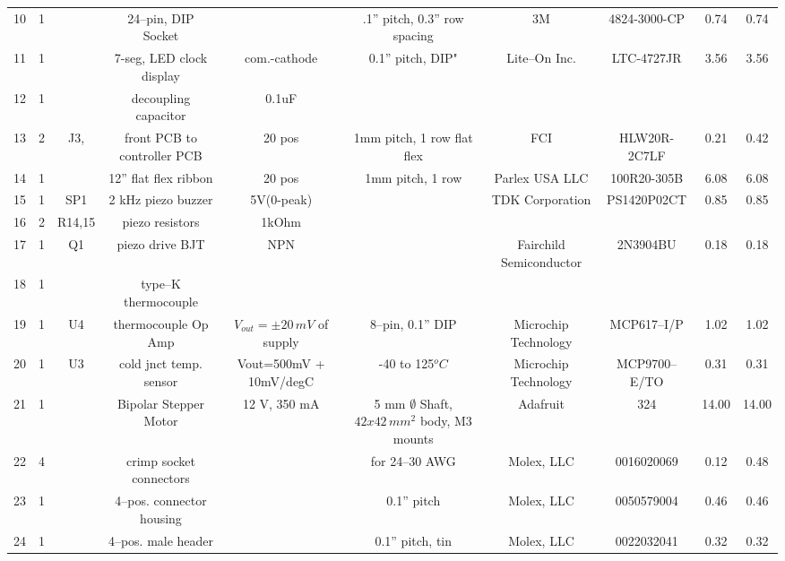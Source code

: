 \documentclass[10pt, twocolumn]{article}
\begin{document}
\begin{center}
\begin{adjustbox}{max width=\textwidth}
\begin{tabular}{c c c c c c c c c c}
10	&1	&	&24--pin, DIP Socket	&				&.1” pitch, 0.3” row spacing
	&3M		&4824-3000-CP			&0.74		&0.74	\\

11	&1	&	&7-seg, LED clock display	&com.-cathode	&0.1” pitch, DIP"
	&Lite--On Inc.		&LTC-4727JR		&3.56		&3.56	\\

12	&1	&	&decoupling capacitor	&0.1uF				&
	&		&				&		&	\\

13	&2	&J3,	&front PCB to controller PCB	&20 pos			&1mm pitch, 1 row flat flex
	&FCI			&HLW20R-2C7LF		&0.21		&0.42	\\

14	&1	&	&12” flat flex ribbon		&20 pos		&1mm pitch, 1 row
	&Parlex USA LLC		&100R20-305B		&6.08		&6.08	\\

15	&1	&SP1	&2 kHz piezo buzzer	&5V(0-peak)			&
	&TDK Corporation	&PS1420P02CT		&0.85		&0.85	\\

16	&2	&R14,15	&piezo resistors	&1kOhm				&
	&			&			&		&	\\

17	&1	&Q1	&piezo drive BJT		&NPN				&
	&Fairchild Semiconductor	&2N3904BU	&0.18		&0.18	\\

18	&1	&	&type--K thermocouple	&				&
	&			&			&		&	\\

19	&1	&U4	&thermocouple Op Amp	&$V_{out}=\pm 20\,mV$ of supply	&8--pin, 0.1” DIP
	&Microchip Technology	&MCP617--I/P		&1.02		&1.02	\\

20	&1	&U3	&cold jnct temp. sensor	&Vout=500mV + 10mV/degC 	&-40 to 125$^{o}C$
	&Microchip Technology	&MCP9700--E/TO		&0.31		&0.31	\\

21	&1	&	&Bipolar Stepper Motor	&12 V, 350 mA		&5 mm $\emptyset$ Shaft, $42x42\,mm^{2}$ body, M3 mounts
	&Adafruit		&324			&14.00		&14.00	\\

22	&4	&	&crimp socket connectors	&			&for 24--30 AWG
	&Molex, LLC		&0016020069		&0.12		&0.48	\\

23	&1	&	&4--pos. connector housing	&			&0.1'' pitch
	&Molex, LLC		&0050579004		&0.46		&0.46	\\

24	&1	&	&4--pos. male header	&				&0.1'' pitch, tin
	&Molex, LLC		&0022032041		&0.32		&0.32	\\


\end{tabular}
\end{adjustbox}
\end{center}
\end{document}
